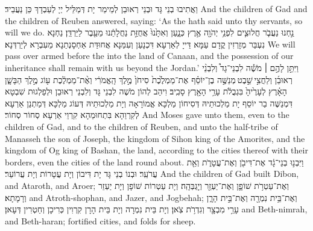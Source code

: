 {וַאֲתִיבוּ בְנֵי גָּד וּבְנֵי רְאוּבֵן לְמֵימַר יָת דְּמַלֵּיל יְיָ לְעַבְדָךְ כֵּן נַעֲבֵיד׃}
{And the children of Gad and the children of Reuben answered, saying: ‘As the \lord\space hath said unto thy servants, so will we do.}{}
{נַ֣חְנוּ נַעֲבֹ֧ר חֲלוּצִ֛ים לִפְנֵ֥י יְהֹוָ֖ה אֶ֣רֶץ כְּנָ֑עַן וְאִתָּ֙נוּ֙ אֲחֻזַּ֣ת נַחֲלָתֵ֔נוּ מֵעֵ֖בֶר לַיַּרְדֵּֽן׃
}
{נַחְנָא נִעְבַּר מְזָרְזִין קֳדָם עַמָּא דַּייָ לְאַרְעָא דִּכְנָעַן וְעִמַּנָא אֲחוּדַּת אַחְסָנְתַנָא מֵעִבְרָא לְיַרְדְּנָא׃}
{We will pass over armed before the \lord\space into the land of Canaan, and the possession of our inheritance shall remain with us beyond the Jordan.’}{}
{וַיִּתֵּ֣ן לָהֶ֣ם \small ׀\normalsize  מֹשֶׁ֡ה לִבְנֵי־גָד֩ וְלִבְנֵ֨י רְאוּבֵ֜ן וְלַחֲצִ֣י \legarmeh  שֵׁ֣בֶט \legarmeh  מְנַשֶּׁ֣ה בֶן־יוֹסֵ֗ף אֶת־מַמְלֶ֙כֶת֙ סִיחֹן֙ מֶ֣לֶךְ הָֽאֱמֹרִ֔י וְאֶ֨ת־מַמְלֶ֔כֶת ע֖וֹג מֶ֣לֶךְ הַבָּשָׁ֑ן הָאָ֗רֶץ לְעָרֶ֙יהָ֙ בִּגְבֻלֹ֔ת עָרֵ֥י הָאָ֖רֶץ סָבִֽיב׃}
{וִיהַב לְהוֹן מֹשֶׁה לִבְנֵי גָּד וְלִבְנֵי רְאוּבֵן וּלְפַלְגוּת שִׁבְטָא דִּמְנַשֶּׁה בַר יוֹסֵף יָת מַלְכוּתֵיהּ דְּסִיחוֹן מַלְכָּא אֱמוֹרָאָה וְיָת מַלְכוּתֵיהּ דְּעוֹג מַלְכָּא דְּמַתְנַן אַרְעָא לְקִרְוַהָא בִּתְחוּמַהָא קִרְוֵי אַרְעָא סְחוֹר סְחוֹר׃}
{And Moses gave unto them, even to the children of Gad, and to the children of Reuben, and unto the half-tribe of Manasseh the son of Joseph, the kingdom of Sihon king of the Amorites, and the kingdom of Og king of Bashan, the land, according to the cities thereof with their borders, even the cities of the land round about.}{}
{וַיִּבְנ֣וּ בְנֵי־גָ֔ד אֶת־דִּיבֹ֖ן וְאֶת־עֲטָרֹ֑ת וְאֵ֖ת עֲרֹעֵֽר׃}
{וּבְנוֹ בְנֵי גָּד יָת דִּיבוֹן וְיָת עֲטָרוֹת וְיָת עֲרוֹעֵר׃}
{And the children of Gad built Dibon, and Ataroth, and Aroer;}{}
{וְאֶת־עַטְרֹ֥ת שׁוֹפָ֛ן וְאֶת־יַעְזֵ֖ר וְיׇגְבְּהָֽה׃}
{וְיָת עַטְרוֹת שׁוֹפָן וְיָת יַעְזֵר וְרָמָתָא׃}
{and Atroth-shophan, and Jazer, and Jogbehah;}{}
{וְאֶת־בֵּ֥ית נִמְרָ֖ה וְאֶת־בֵּ֣ית הָרָ֑ן עָרֵ֥י מִבְצָ֖ר וְגִדְרֹ֥ת צֹֽאן׃
}
{וְיָת בֵּית נִמְרָה וְיָת בֵּית הָרָן קִרְוִין כְּרִיכָן וְחַטְרִין דְּעָאן׃}
{and Beth-nimrah, and Beth-haran; fortified cities, and folds for sheep.}{}
